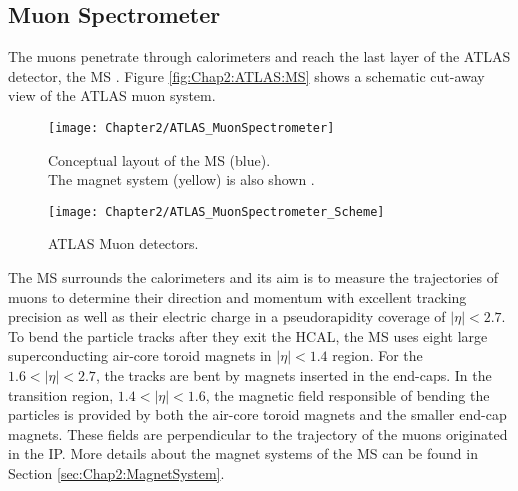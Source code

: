 \subsection{Muon Spectrometer}
\label{sec:Chap2:ATLAS:MS}
The muons penetrate through calorimeters and reach the last layer of the ATLAS detector, the MS \cite{ATLAS:1997ad}. %
Figure \ref{fig:Chap2:ATLAS:MS} shows a schematic cut-away view of the ATLAS muon system.

\begin{figure}
\centering
\begin{minipage}{.64\textwidth}
 	\centering
 	 \texttt{[image: Chapter2/ATLAS\_MuonSpectrometer]}
	 \caption{Conceptual layout of the MS (blue). \\The magnet system (yellow) is also shown \cite{ATLAS:2008xda}.}
	 \label{fig:Chap2:ATLAS:MS}
  \label{fig:test1}
\end{minipage}%
\begin{minipage}{.35\textwidth}
 	\centering
	\texttt{[image: Chapter2/ATLAS\_MuonSpectrometer\_Scheme]}
	\caption{ATLAS Muon detectors.} 
	\label{fig:Chap2:ATLAS:MS:Scheme}
\end{minipage}
\end{figure}




The MS surrounds the calorimeters and its aim is to  measure the trajectories of muons 
to determine their direction and momentum with excellent tracking precision
as well as their electric charge in a pseudorapidity coverage of $|\eta| < 2.7$. 
To bend the particle tracks after they exit the HCAL, the MS uses eight large 
superconducting air-core toroid magnets in $|\eta| < 1.4$ region.
For the $1.6 < |\eta| < 2.7$, the tracks are bent by magnets inserted in the end-caps. 
In the transition region, $1.4 < |\eta| < 1.6$, the magnetic field responsible of bending
the particles is provided by both the air-core toroid magnets and the smaller end-cap magnets. 
These fields are perpendicular to the trajectory of the muons originated in the IP. More details 
about the magnet systems of the MS can be found in Section \ref{sec:Chap2:MagnetSystem}.


